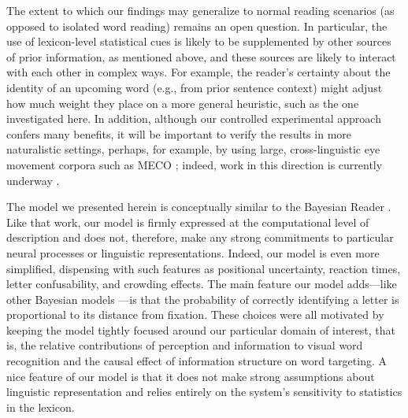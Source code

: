 \documentclass[doc,biblatex,floatsintext]{apa7}
\begin{document}
The extent to which our findings may generalize to normal reading scenarios (as opposed to isolated word reading) remains an open question. In particular, the use of lexicon-level statistical cues is likely to be supplemented by other sources of prior information, as mentioned above, and these sources are likely to interact with each other in complex ways. For example, the reader's certainty about the identity of an upcoming word (e.g., from prior sentence context) might adjust how much weight they place on a more general heuristic, such as the one investigated here. In addition, although our controlled experimental approach confers many benefits, it will be important to verify the results in more naturalistic settings, perhaps, for example, by using large, cross-linguistic eye movement corpora such as MECO \parencite{Siegelman:2022}; indeed, work in this direction is currently underway \parencite{Shafir:2022}.

The model we presented herein is conceptually similar to the Bayesian Reader \parencite{Norris:2006, Norris:2009, Norris:2012}. Like that work, our model is firmly expressed at the computational level of description \parencite{Marr:1982} and does not, therefore, make any strong commitments to particular neural processes or linguistic representations. Indeed, our model is even more simplified, dispensing with such features as positional uncertainty, reaction times, letter confusability, and crowding effects. The main feature our model adds---like other Bayesian models \parencite{SmithChan:2010, Bicknell:2012, Valdois:2021}---is that the probability of correctly identifying a letter is proportional to its distance from fixation. These choices were all motivated by keeping the model tightly focused around our particular domain of interest, that is, the relative contributions of perception and information to visual word recognition and the causal effect of information structure on word targeting. A nice feature of our model is that it does not make strong assumptions about linguistic representation and relies entirely on the system's sensitivity to statistics in the lexicon.
\end{document}
